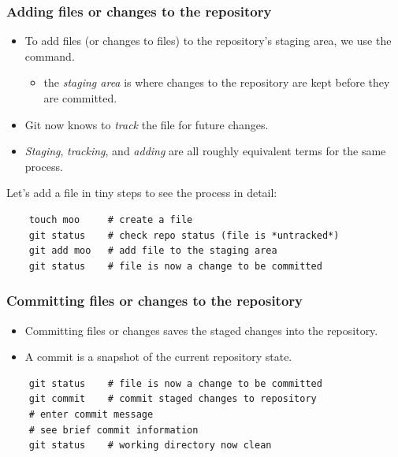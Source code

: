 %
%


\begin{frame}[fragile]
\frametitle{Adding files or changes to the repository}
\begin{itemize}
    \item To add files (or changes to files) to the repository's
        staging area, we use the  command.
    \begin{itemize}
        \item the \emph{staging area} is where changes to the repository
            are kept before they are committed.
    \end{itemize}
    \item Git now knows to \emph{track} the file for future changes.
    \item \emph{Staging}, \emph{tracking}, and \emph{adding} are all
        roughly equivalent terms for the same process.
\end{itemize}

Let's add a file in tiny steps to see the process in detail:
    \begin{verbatim}
    touch moo     # create a file
    git status    # check repo status (file is *untracked*)
    git add moo   # add file to the staging area
    git status    # file is now a change to be committed
    \end{verbatim}
\end{frame}


\begin{frame}[fragile]
\frametitle{Committing files or changes to the repository}
\begin{itemize}
    \item Committing files or changes saves the staged changes into the
        repository.
    \item A commit is a snapshot of the current repository state.
\end{itemize}
    \begin{verbatim}
    git status    # file is now a change to be committed
    git commit    # commit staged changes to repository
    # enter commit message
    # see brief commit information
    git status    # working directory now clean
    \end{verbatim}
\end{frame}


